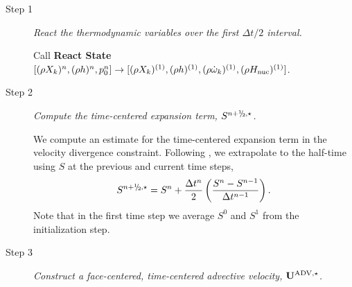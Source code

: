 \begin{description}

\item[Step 1] {\em React the thermodynamic variables over the first $\Delta t / 2$ interval.}

Call {\bf React State}$[(\rho X_k)^n, (\rho h)^n, p_0^n] \rightarrow [(\rho X_k)^{(1)}, (\rho h)^{(1)}, (\rho \dot\omega_k)^{(1)}, (\rho H_{\rm nuc})^{(1)}]$.


\item[Step 2] {\em Compute the time-centered expansion term, $S^{\nph,\star}$.}

We compute an estimate for the time-centered expansion term in the velocity
divergence constraint.  Following \citet{Bell:2004}, we extrapolate
to the half-time using $S$ at the previous and current
time steps,
\begin{equation}
S^{\nph,\star} = S^n + \frac{\dt^n}{2} \left(\frac{S^n - S^{n-1}}{\dt^{n-1}}\right).
\end{equation}
Note that in the first time step we average $S^0$ and $S^1$ from the
initialization step.

\item[Step 3] {\em Construct a face-centered, time-centered advective velocity, ${\bf{U}}^{\mathrm{ADV},\star}$.}


\end{description}
